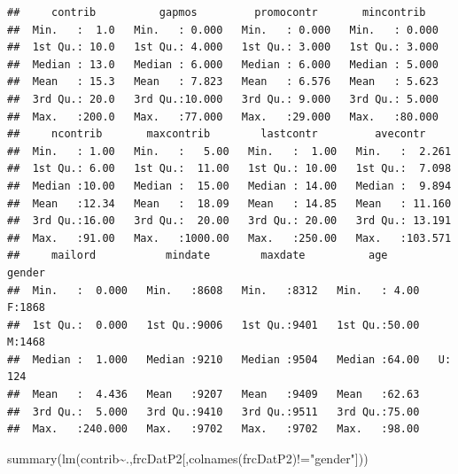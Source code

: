 \documentclass[
]{article}
\newenvironment{Shaded}{\begin{snugshade}}{\end{snugshade}}
\newcommand{\FunctionTok}[1]{\textcolor[rgb]{0.00,0.00,0.00}{#1}}
\newcommand{\NormalTok}[1]{#1}
\newcommand{\SpecialCharTok}[1]{\textcolor[rgb]{0.00,0.00,0.00}{#1}}
\newcommand{\StringTok}[1]{\textcolor[rgb]{0.31,0.60,0.02}{#1}}
\begin{document}
\begin{verbatim}
##     contrib          gapmos         promocontr       mincontrib    
##  Min.   :  1.0   Min.   : 0.000   Min.   : 0.000   Min.   : 0.000  
##  1st Qu.: 10.0   1st Qu.: 4.000   1st Qu.: 3.000   1st Qu.: 3.000  
##  Median : 13.0   Median : 6.000   Median : 6.000   Median : 5.000  
##  Mean   : 15.3   Mean   : 7.823   Mean   : 6.576   Mean   : 5.623  
##  3rd Qu.: 20.0   3rd Qu.:10.000   3rd Qu.: 9.000   3rd Qu.: 5.000  
##  Max.   :200.0   Max.   :77.000   Max.   :29.000   Max.   :80.000  
##     ncontrib       maxcontrib        lastcontr         avecontr      
##  Min.   : 1.00   Min.   :   5.00   Min.   :  1.00   Min.   :  2.261  
##  1st Qu.: 6.00   1st Qu.:  11.00   1st Qu.: 10.00   1st Qu.:  7.098  
##  Median :10.00   Median :  15.00   Median : 14.00   Median :  9.894  
##  Mean   :12.34   Mean   :  18.09   Mean   : 14.85   Mean   : 11.160  
##  3rd Qu.:16.00   3rd Qu.:  20.00   3rd Qu.: 20.00   3rd Qu.: 13.191  
##  Max.   :91.00   Max.   :1000.00   Max.   :250.00   Max.   :103.571  
##     mailord           mindate        maxdate          age        gender  
##  Min.   :  0.000   Min.   :8608   Min.   :8312   Min.   : 4.00   F:1868  
##  1st Qu.:  0.000   1st Qu.:9006   1st Qu.:9401   1st Qu.:50.00   M:1468  
##  Median :  1.000   Median :9210   Median :9504   Median :64.00   U: 124  
##  Mean   :  4.436   Mean   :9207   Mean   :9409   Mean   :62.63           
##  3rd Qu.:  5.000   3rd Qu.:9410   3rd Qu.:9511   3rd Qu.:75.00           
##  Max.   :240.000   Max.   :9702   Max.   :9702   Max.   :98.00
\end{verbatim}

\begin{Shaded}
\begin{Highlighting}[]
\FunctionTok{summary}\NormalTok{(}\FunctionTok{lm}\NormalTok{(contrib}\SpecialCharTok{\textasciitilde{}}\NormalTok{.,frcDatP2[,}\FunctionTok{colnames}\NormalTok{(frcDatP2)}\SpecialCharTok{!=}\StringTok{"gender"}\NormalTok{]))}
\end{Highlighting}
\end{Shaded}
\end{document}
